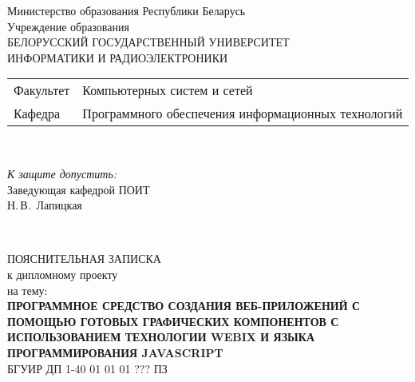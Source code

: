 \begin{titlepage}
  \begin{center}
    Министерство образования Республики Беларусь\\[1em]
    Учреждение образования\\
    БЕЛОРУССКИЙ ГОСУДАРСТВЕННЫЙ УНИВЕРСИТЕТ \\
    ИНФОРМАТИКИ И РАДИОЭЛЕКТРОНИКИ\\[1em]

    \begin{minipage}{\textwidth}
      \begin{flushleft}
        \begin{tabular}{ l l }
          Факультет & Компьютерных систем и сетей\\
          Кафедра   & Программного обеспечения информационных технологий
        \end{tabular}
      \end{flushleft}
    \end{minipage}\\[1em]

    \begin{flushright}
      \begin{minipage}{0.4\textwidth}
        \textit{К защите допустить:}\\[0.8em]
        Заведующая кафедрой ПОИТ\\[0.45em]
        \underline{\hspace*{2.8cm}} Н.\,В.~Лапицкая
      \end{minipage}\\[2.2em]
    \end{flushright}

    {ПОЯСНИТЕЛЬНАЯ ЗАПИСКА}\\
    {к дипломному проекту}\\
    {на тему:}\\[1em]
    \textbf{\large \MakeUppercase{Программное средство создания веб-приложений с помощью 
    готовых графических компонентов с использованием технологии Webix и языка программирования JavaScript
    }}\\[1em]


    {БГУИР ДП 1-40 01 01 01 ??? ПЗ}\\[2em]
    

\end{center}
\end{titlepage}
